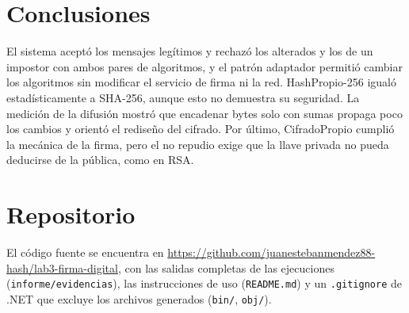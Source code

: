 \documentclass[conference]{IEEEtran}
\begin{document}
\section{Conclusiones}
\label{sec:conclusiones}

El sistema aceptó los mensajes legítimos y rechazó los alterados y los de un impostor con ambos pares de algoritmos, y el patrón adaptador permitió cambiar los algoritmos sin modificar el servicio de firma ni la red. HashPropio-256 igualó estadísticamente a SHA-256, aunque esto no demuestra su seguridad. La medición de la difusión mostró que encadenar bytes solo con sumas propaga poco los cambios y orientó el rediseño del cifrado. Por último, CifradoPropio cumplió la mecánica de la firma, pero el no repudio exige que la llave privada no pueda deducirse de la pública, como en RSA.

\section{Repositorio}
\label{sec:repositorio}

El código fuente se encuentra en \url{https://github.com/juanestebanmendez88-hash/lab3-firma-digital}, con las salidas completas de las ejecuciones (\texttt{informe/evidencias}), las instrucciones de uso (\texttt{README.md}) y un \texttt{.gitignore} de .NET que excluye los archivos generados (\texttt{bin/}, \texttt{obj/}).
\end{document}
